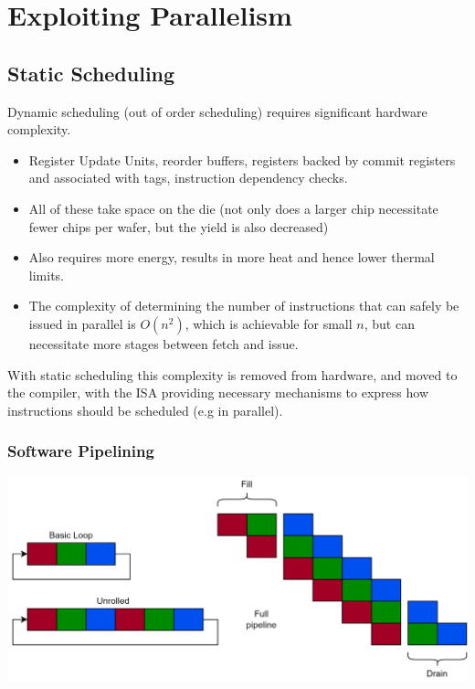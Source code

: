 \chapter{Exploiting Parallelism}

\section{Static Scheduling}
Dynamic scheduling (out of order scheduling) requires significant hardware complexity.
\begin{itemize}
    \item Register Update Units, reorder buffers, registers backed by commit registers and associated with tags, instruction dependency checks.
    \item All of these take space on the die (not only does a larger chip necessitate fewer chips per wafer, but the yield is also decreased)
    \item Also requires more energy, results in more heat and hence lower thermal limits.
    \item The complexity of determining the number of instructions that can safely be issued in parallel is $O(n^2)$, which is achievable for small $n$, but can necessitate more stages between fetch and issue.
\end{itemize}
With static scheduling this complexity is removed from hardware, and moved to the compiler, with the ISA providing necessary mechanisms to express how instructions should be scheduled (e.g in parallel).

\subsection{Software Pipelining}
\begin{center}
    \includegraphics[width=\textwidth]{exploiting_parallelism/images/software_pipelining.drawio.png}
\end{center}

